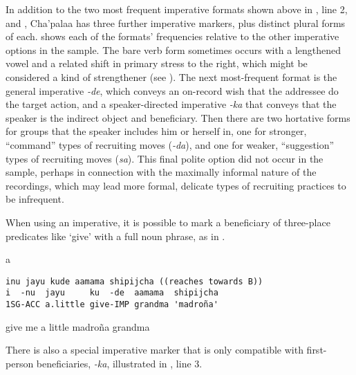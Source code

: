 \documentclass[output=paper]{langsci/langscibook}
\begin{document}
In addition to the two most frequent imperative formats shown above in , line 2, and , Cha’palaa has three further imperative markers, plus distinct plural forms of each.  shows each of the formats’ frequencies relative to the other imperative options in the sample. The bare verb form sometimes occurs with a lengthened vowel and a related shift in primary stress to the right, which might be considered a kind of strengthener (see ). The next most-frequent format is the general imperative \textit{-de}, which conveys an on-record wish that the addressee do the target action, and a speaker-directed imperative \textit{-ka} that conveys that the speaker is the indirect object and beneficiary. Then there are two hortative forms for groups that the speaker includes him or herself in, one for stronger, “command” types of recruiting moves (\textit{-da}), and one for weaker, “suggestion” types of recruiting moves (\textit{sa}). This final polite option did not occur in the sample, perhaps in connection with the maximally informal nature of the recordings, which may lead more formal, delicate types of recruiting practices to be infrequent.

When using an imperative, it is possible to mark a beneficiary of three-place predicates like ‘give’ with a full noun phrase, as in .

\vspace{-1mm}
%
\begin{mdframednoverticalspace}[style=firstfoc]
\begin{transbox}{1}{a}
\begin{verbatim}
inu jayu kude aamama shipijcha ((reaches towards B))
i  -nu  jayu     ku  -de  aamama  shipijcha
1SG-ACC a.little give-IMP grandma 'madroña'
\end{verbatim}
give me a little madroña grandma
\end{transbox}
\end{mdframednoverticalspace}
%
\begin{mdframednoverticalspace}[style=secondfoc]
\end{mdframednoverticalspace}

There is also a special imperative marker that is only compatible with first-person beneficiaries, \textit{{}-ka}, illustrated in , line 3.
\end{document}
